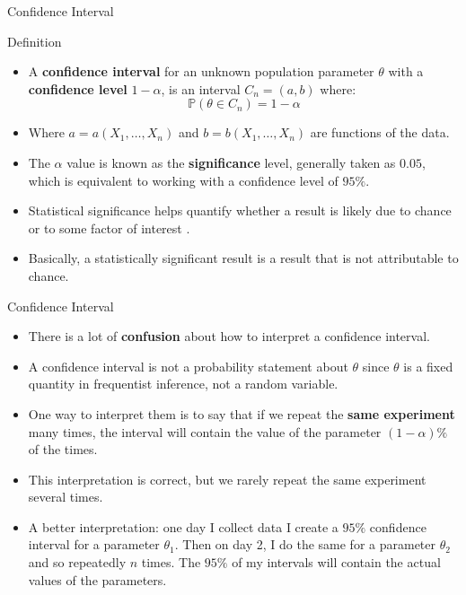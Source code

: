 \documentclass[handout]{beamer}
\begin{document}
\begin{frame}{Confidence Interval }
\scriptsize{

\begin{block}{Definition}
\begin{itemize}
 \item A \textbf{confidence interval} for an unknown population parameter $\theta$ with a \textbf{confidence level} $1-\alpha$, is an interval $C_n = (a,b)$ where:
 \begin{displaymath}
 \mathbb{P}(\theta \in C_n) = 1-\alpha
\end{displaymath}
 \item Where $a= a(X_1, \dots, X_n)$ and $b=b(X_1,\dots,X_n)$ are functions of the data.
 \item The $\alpha$ value is known as the \textbf{significance} level, generally taken as $0.05$, which is equivalent to working with a confidence level of $95\%$.
 \item Statistical significance helps quantify whether a result is likely due to chance or to some factor of interest \cite{gallo2016refresher}. 
 
 \item Basically, a statistically significant result is a result that is not attributable to chance.
 
\end{itemize}

\end{block}

}
 
\end{frame}


\begin{frame}{Confidence Interval}
\scriptsize{


\begin{itemize}
 \item There is a lot of \textbf{confusion} about how to interpret a confidence interval.
 \item A confidence interval is not a probability statement about $\theta$ since $\theta$ is a fixed quantity in frequentist inference, not a random variable.
 \item One way to interpret them is to say that if we repeat the \textbf{same experiment} many times, the interval will contain the value of the parameter $(1-\alpha)\%$ of the times.
 \item This interpretation is correct, but we rarely repeat the same experiment several times.
 \item A better interpretation: one day I collect data I create a $95\%$ confidence interval for a parameter $\theta_1$. Then on day 2, I do the same for a parameter $\theta_2$ and so repeatedly $n$ times. The $95\%$ of my intervals will contain the actual values of the parameters. 
 
\end{itemize}



}
 
\end{frame}
\end{document}
